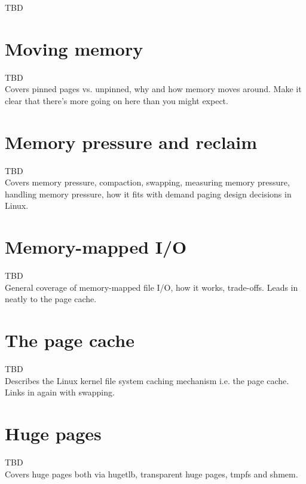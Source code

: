 \documentclass[a4paper,oneside]{scrbook}
\begin{document}
TBD\\

\chapter{Moving memory}

TBD\\

Covers pinned pages vs. unpinned, why and how memory moves around. Make it clear
that there's more going on here than you might expect.\\

\chapter{Memory pressure and reclaim}

TBD\\

Covers memory pressure, compaction, swapping, measuring memory pressure,
handling memory pressure, how it fits with demand paging design decisions in
Linux.\\


\chapter{Memory-mapped I/O}

TBD\\

General coverage of memory-mapped file I/O, how it works, trade-offs. Leads in
neatly to the page cache.

\chapter{The page cache}

TBD\\

Describes the Linux kernel file system caching mechanism i.e. the page
cache. Links in again with swapping.\\

\chapter{Huge pages}

TBD\\

Covers huge pages both via hugetlb, transparent huge pages, tmpfs and shmem.\\
\end{document}
